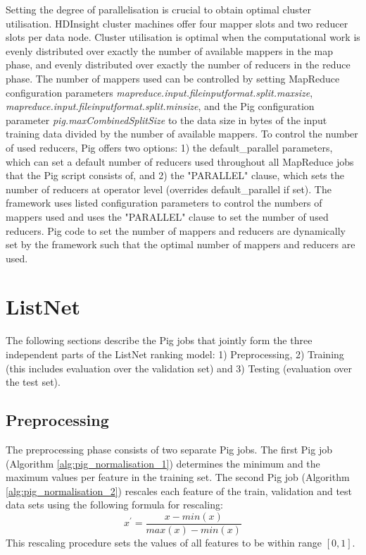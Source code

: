 \begin{sloppypar}
Setting the degree of parallelisation is crucial to obtain optimal cluster utilisation. HDInsight cluster machines offer four mapper slots and two reducer slots per data node. Cluster utilisation is optimal when the computational work is evenly distributed over exactly the number of available mappers in the map phase, and evenly distributed over exactly the number of reducers in the reduce phase. The number of mappers used can be controlled by setting MapReduce configuration parameters \emph{mapreduce.input.fileinputformat.split.maxsize}, \emph{mapreduce.input.fileinputformat.split.minsize}, and the Pig configuration parameter \emph{pig.maxCombinedSplitSize} to the data size in bytes of the input training data divided by the number of available mappers. To control the number of used reducers, Pig offers two options: 1) the default\_parallel parameters, which can set a default number of reducers used throughout all MapReduce jobs that the Pig script consists of, and 2) the "PARALLEL" clause, which sets the number of reducers at operator level (overrides default\_parallel if set). The framework uses listed configuration parameters to control the numbers of mappers used and uses the "PARALLEL" clause to set the number of used reducers. Pig code to set the number of mappers and reducers are dynamically set by the framework such that the optimal number of mappers and reducers are used.
\end{sloppypar}

\section{ListNet}
The following sections describe the Pig jobs that jointly form the three independent parts of the ListNet ranking model: 1) Preprocessing, 2) Training (this includes evaluation over the validation set) and 3) Testing (evaluation over the test set). 
\subsection{Preprocessing}
\label{ssec:preprocessing}
The preprocessing phase consists of two separate Pig jobs. The first Pig job (Algorithm \ref{alg:pig_normalisation_1}) determines the minimum and the maximum values per feature in the training set. The second Pig job (Algorithm \ref{alg:pig_normalisation_2}) rescales each feature of the train, validation and test data sets using the following formula for rescaling:
\begin{equation}
x^{'} = \frac{x-min(x)}{max(x)-min(x)}
\label{eq:rescaling}
\end{equation}
This rescaling procedure sets the values of all features to be within range $[0,1]$.\\

